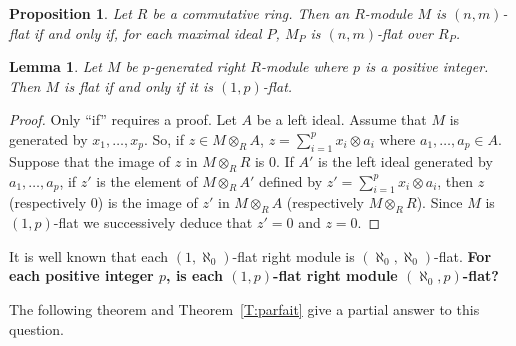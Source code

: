 \documentclass{amsart}
\newtheorem{lemma}[theorem]{Lemma}
\newtheorem{proposition}[theorem]{Proposition}
\begin{document}
\begin{proposition}
\label{P:localflat} Let $R$ be a commutative ring. Then an $R$-module $M$ is $(n,m)$-flat if and only if, for each maximal ideal $P$, $M_P$ is $(n,m)$-flat over $R_P$.
\end{proposition}

\begin{lemma}
\label{L:p-gen} Let $M$ be $p$-generated right $R$-module where $p$ is a positive integer. Then $M$ is flat if and only if it is $(1,p)$-flat.
\end{lemma}
\begin{proof}
Only ``if'' requires a proof. Let $A$ be a left ideal. Assume that $M$ is generated by $x_1,\dots,x_p$. So, if $z\in M\otimes_RA$, $z=\sum_{i=1}^px_i\otimes a_i$ where $a_1,\dots,a_p\in A$. Suppose that the image of $z$ in $M\otimes_RR$ is $0$. If $A'$ is the left ideal generated by $a_1,\dots,a_p$, if $z'$ is the element of $M\otimes_RA'$ defined by $z'=\sum_{i=1}^px_i\otimes a_i$, then $z$ (respectively $0$) is the image of $z'$ in $M\otimes_RA$ (respectively $M\otimes_RR$). Since $M$ is $(1,p)$-flat we successively deduce that $z'=0$ and $z=0$.
\end{proof}

\bigskip
It is well known that each $(1,\aleph_0)$-flat right module is $(\aleph_0,\aleph_0)$-flat. {\bf For each positive integer $p$, is each $(1,p)$-flat right module $(\aleph_0,p)$-flat?} 

The following theorem and Theorem~\ref{T:parfait} give a partial answer to this question.
\end{document}
